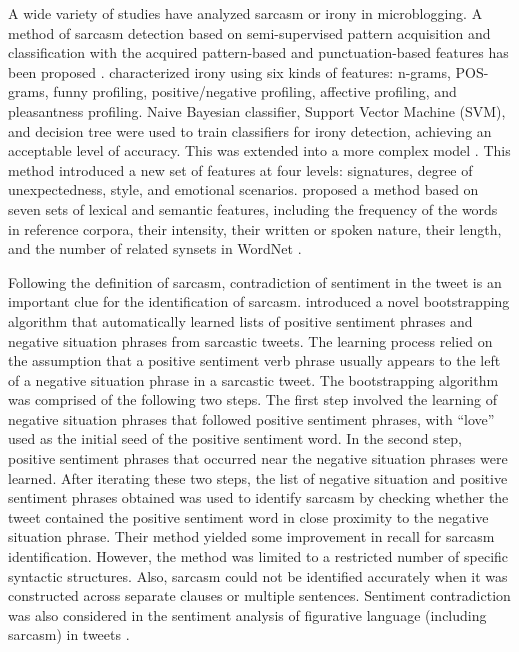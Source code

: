 \documentclass[english]{jnlp_1.4}
\begin{document}
A wide variety of studies have analyzed sarcasm or irony in microblogging.
A method of sarcasm detection based on semi-supervised pattern acquisition and classification with the acquired pattern-based and punctuation-based features has been proposed \cite{Tsur_2010,Davidov_2010}.
 characterized irony using six kinds of features: n-grams, POS-grams, funny profiling, positive/negative profiling, affective profiling, and pleasantness profiling.
Naive Bayesian classifier, Support Vector Machine (SVM), and decision tree were used to train classifiers for irony detection, achieving an acceptable level of accuracy.
This was extended into a more complex model \cite{Reyes_2013}.
This method introduced a new set of features at four levels: signatures, degree of unexpectedness, style, and emotional scenarios.
 proposed a method based on seven sets of lexical and semantic features, including the frequency of the words in reference corpora, their intensity, their written or spoken nature, their length, and the number of related synsets in WordNet \cite{Miller_1995}.

Following the definition of sarcasm, contradiction of sentiment in the tweet is an important clue for the identification of sarcasm.
 introduced a novel bootstrapping algorithm that automatically learned lists of positive sentiment phrases and negative situation phrases from sarcastic tweets.
The learning process relied on the assumption that a positive sentiment verb phrase usually appears to the left of a negative situation phrase in a sarcastic tweet.
The bootstrapping algorithm was comprised of the following two steps.
The first step involved the learning of negative situation phrases that followed positive sentiment phrases, with ``love'' used as the initial seed of the positive sentiment word.
In the second step, positive sentiment phrases that occurred near the negative situation phrases were learned.
After iterating these two steps, the list of negative situation and positive sentiment phrases obtained was used to identify sarcasm by checking whether the tweet contained the positive sentiment word in close proximity to the negative situation phrase.
Their method yielded some improvement in recall for sarcasm identification.
However, the method was limited to a restricted number of specific syntactic structures.
Also, sarcasm could not be identified accurately when it was constructed across separate clauses or multiple sentences.
Sentiment contradiction was also considered in the sentiment analysis of figurative language (including sarcasm) in tweets \cite{Xu_2015}.
\end{document}

